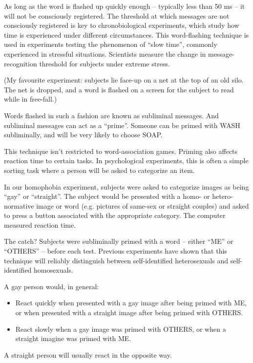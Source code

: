 As long as the word is flashed up quickly enough -- typically less than 50 ms -- it will not be consciously registered. The threshold at which messages are not consciously registered is key to chronobiological experiments, which study how time is experienced under different circumstances. This word-flashing technique is used in experiments testing the phenomenon of ``slow time'', commonly experienced in stressful situations. Scientists measure the change in message-recognition threshold for subjects under extreme stress.

(My favourite experiment: subjects lie face-up on a net at the top of an old silo. The net is dropped, and a word is flashed on a screen for the subject to read while in free-fall.)

Words flashed in such a fashion are known as subliminal messages. And subliminal messages can act as a ``prime''. Someone can be primed with WASH subliminally, and will be very likely to choose SOAP.

This technique isn't restricted to word-association games. Priming also affects reaction time to certain tasks. In psychological experiments, this is often a simple sorting task where a person will be asked to categorize an item.

In our homophobia experiment, subjects were asked to categorize images as being ``gay'' or ``straight''. The subject would be presented with a homo- or hetero-normative image or word (e.g. pictures of same-sex or straight couples) and asked to press a button associated with the appropriate category. The computer measured reaction time.

The catch? Subjects were subliminally primed with a word -- either ``ME'' or ``OTHERS'' -- before each test. Previous experiments have shown that this technique will reliably distinguish between self-identified heterosexuals and self-identified homosexuals.

A gay person would, in general:

\begin{itemize}
  \item React quickly when presented with a gay image after being primed with ME, or when presented with a straight image after being primed with OTHERS.
  \item React slowly when a gay image was primed with OTHERS, or when a straight imagine was primed with ME.
\end{itemize}

A straight person will usually react in the opposite way.


